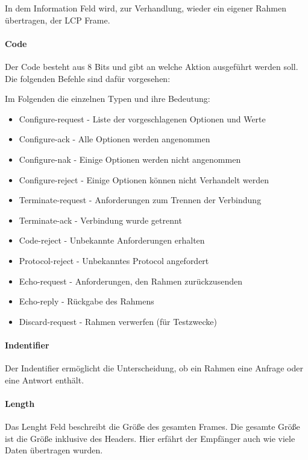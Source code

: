 \documentclass[12pt, a4paper, ngerman]{article}
\begin{document}
In dem Information Feld wird, zur Verhandlung, wieder ein eigener Rahmen übertragen, der LCP Frame. 
\paragraph{Code}
Der Code besteht aus 8 Bits und gibt an welche Aktion ausgeführt werden soll. Die folgenden Befehle sind dafür vorgesehen:


Im Folgenden die einzelnen Typen und ihre Bedeutung:

\begin{itemize}
	\item Configure-request	- Liste der vorgeschlagenen Optionen und Werte
	\item Configure-ack		- Alle Optionen werden angenommen
	\item	Configure-nak		- Einige Optionen werden nicht angenommen
	\item Configure-reject	- Einige Optionen können nicht Verhandelt werden
	\item Terminate-request	- Anforderungen zum Trennen der Verbindung
	\item Terminate-ack		- Verbindung wurde getrennt
	\item Code-reject		- Unbekannte Anforderungen erhalten
	\item Protocol-reject		- Unbekanntes Protocol angefordert
	\item Echo-request		- Anforderungen, den Rahmen zurückzusenden
	\item Echo-reply		- Rückgabe des Rahmens
	\item	Discard-request	- Rahmen verwerfen (für Testzwecke)
\end{itemize} 

\paragraph{Indentifier}
Der Indentifier ermöglicht die Unterscheidung, ob ein Rahmen eine Anfrage oder eine  Antwort enthält.

\paragraph{Length}
Das Lenght Feld beschreibt die Größe des gesamten Frames. Die gesamte Größe ist die Größe inklusive des Headers. Hier erfährt der Empfänger auch wie viele Daten übertragen wurden.
\end{document}
